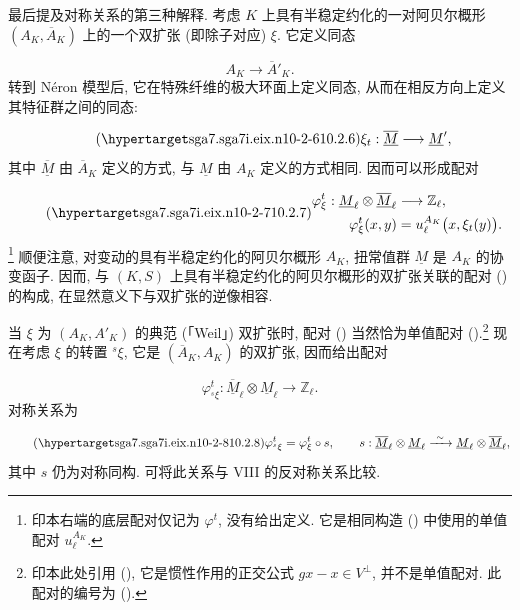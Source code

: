 最后提及对称关系的第三种解释. 考虑 $K$ 上具有半稳定约化的一对阿贝尔概形 $(A_K,\overline A_K)$ 上的一个双扩张 (即除子对应) $\xi$. 它定义同态

\begin{equation*}
A_K\longrightarrow\overline A'_K.
\end{equation*}
转到 Néron 模型后, 它在特殊纤维的极大环面上定义同态, 从而在相反方向上定义其特征群之间的同态:

\begin{equation}\tag{\SGARefTarget{sga7.sga7i.eix.n10-2-6}{10.2.6}}
\xi_t:\overline{\underline M}\longrightarrow\underline M',
\end{equation}
其中 $\overline{\underline M}$ 由 $\overline A_K$ 定义的方式, 与 $\underline M$ 由 $A_K$ 定义的方式相同. 因而可以形成配对

\begin{equation}\tag{\SGARefTarget{sga7.sga7i.eix.n10-2-7}{10.2.7}}
\begin{aligned}
\varphi^t_\xi:\underline M_\ell\otimes
 \overline{\underline M}_\ell&\longrightarrow\mathbb Z_\ell,\\
\varphi^t_\xi(x,y)&=u_\ell^{A_K}\bigl(x,\xi_t(y)\bigr).
\end{aligned}
\end{equation}
\footnote{印本右端的底层配对仅记为 $\varphi^t$, 没有给出定义. 它是相同构造 () 中使用的单值配对 $u_\ell^{A_K}$.} 顺便注意, 对变动的具有半稳定约化的阿贝尔概形 $A_K$, 扭常值群 $\underline M$ 是 $A_K$ 的协变函子. 因而, 与 $(K,S)$ 上具有半稳定约化的阿贝尔概形的双扩张关联的配对 () 的构成, 在显然意义下与双扩张的逆像相容.

当 $\xi$ 为 $(A_K,A'_K)$ 的典范 (「Weil」) 双扩张时, 配对 () 当然恰为单值配对 ().\footnote{印本此处引用 (), 它是惯性作用的正交公式 $gx-x\in V^\perp$, 并不是单值配对. 此配对的编号为 ().} 现在考虑 $\xi$ 的转置 ${}^s\xi$, 它是 $(\overline A_K,A_K)$ 的双扩张, 因而给出配对

\begin{equation*}
\varphi^t_{{}^s\xi}:\overline{\underline M}_\ell\otimes
 \underline M_\ell\longrightarrow\mathbb Z_\ell.
\end{equation*}
对称关系为

\begin{equation}\tag{\SGARefTarget{sga7.sga7i.eix.n10-2-8}{10.2.8}}
\varphi^t_{{}^s\xi}=\varphi^t_\xi\circ s,
\qquad
s:\overline{\underline M}_\ell\otimes\underline M_\ell
 \xrightarrow{\ \sim\ }
 \underline M_\ell\otimes\overline{\underline M}_\ell,
\end{equation}
其中 $s$ 仍为对称同构. 可将此关系与 VIII  的反对称关系比较.


